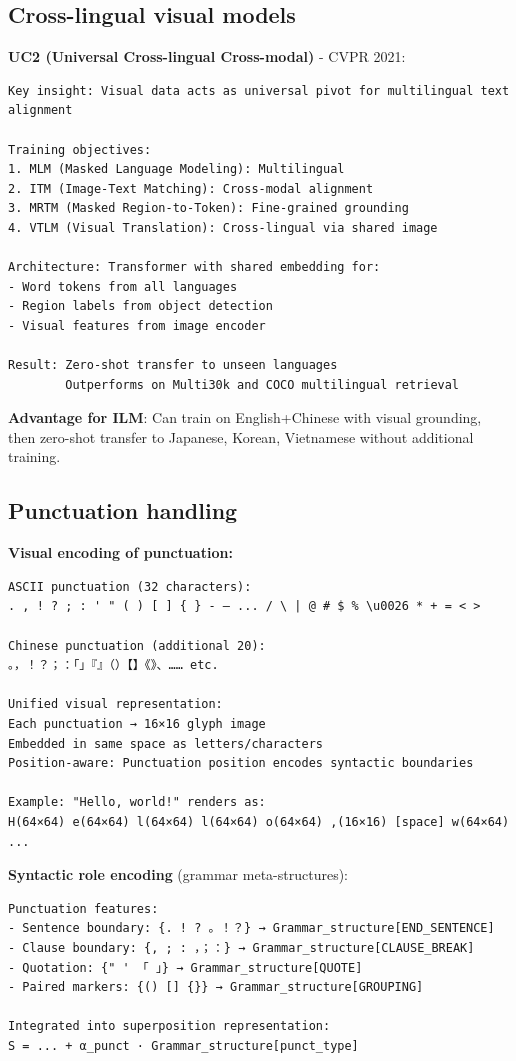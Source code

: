 \documentclass[11pt]{article}
\begin{document}
\subsection{Cross-lingual visual models}

\textbf{UC2 (Universal Cross-lingual Cross-modal)} - CVPR 2021:

\begin{verbatim}
Key insight: Visual data acts as universal pivot for multilingual text alignment

Training objectives:
1. MLM (Masked Language Modeling): Multilingual
2. ITM (Image-Text Matching): Cross-modal alignment
3. MRTM (Masked Region-to-Token): Fine-grained grounding
4. VTLM (Visual Translation): Cross-lingual via shared image

Architecture: Transformer with shared embedding for:
- Word tokens from all languages
- Region labels from object detection
- Visual features from image encoder

Result: Zero-shot transfer to unseen languages
        Outperforms on Multi30k and COCO multilingual retrieval
\end{verbatim}

\textbf{Advantage for ILM}: Can train on English+Chinese with visual grounding, then zero-shot transfer to Japanese, Korean, Vietnamese without additional training.

\subsection{Punctuation handling}

\textbf{Visual encoding of punctuation:}

\begin{verbatim}
ASCII punctuation (32 characters):
. , ! ? ; : ' " ( ) [ ] { } - — ... / \ | @ # $ % \u0026 * + = < >

Chinese punctuation (additional 20):
。，！？；：「」『』（）【】《》、…… etc.

Unified visual representation:
Each punctuation → 16×16 glyph image
Embedded in same space as letters/characters
Position-aware: Punctuation position encodes syntactic boundaries

Example: "Hello, world!" renders as:
H(64×64) e(64×64) l(64×64) l(64×64) o(64×64) ,(16×16) [space] w(64×64) ...
\end{verbatim}

\textbf{Syntactic role encoding} (grammar meta-structures):

\begin{verbatim}
Punctuation features:
- Sentence boundary: {. ! ? 。！？} → Grammar_structure[END_SENTENCE]
- Clause boundary: {, ; : ，；：} → Grammar_structure[CLAUSE_BREAK]
- Quotation: {" ' 「 」} → Grammar_structure[QUOTE]
- Paired markers: {() [] {}} → Grammar_structure[GROUPING]

Integrated into superposition representation:
S = ... + α_punct · Grammar_structure[punct_type]
\end{verbatim}
\end{document}
